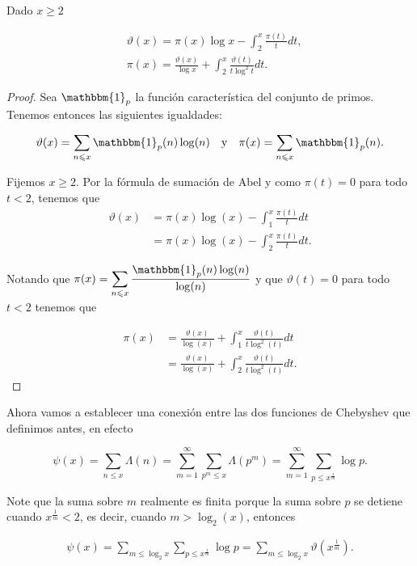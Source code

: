 \begin{theorem}Dado $x\geq 2$\label{rep integral de pi x}

    $$
    \begin{aligned}
    & \vartheta(x)=\pi(x) \log x-\int_2^x \frac{\pi(t)}{t} d t, \\
    & \pi(x)=\frac{\vartheta(x)}{\log x}+\int_2^x \frac{\vartheta(t)}{t \log ^2 t} d t .
    \end{aligned}
    $$
\end{theorem}

\begin{proof}
Sea  $\mathbbm{1}_{p}$ la función característica del conjunto de primos. Tenemos entonces las siguientes igualdades:

$$\vartheta(x)=\sum_{n \leqslant x} \mathbbm{1}_p(n) \log (n)\quad \text{y}\quad \pi(x)=\sum_{n \leqslant x} \mathbbm{1}_p(n).$$

Fijemos $x \geqslant 2$. Por la fórmula de sumación de Abel y como $\pi(t)=0$ para todo $t<2$, tenemos que
$$
\begin{aligned}
\vartheta(x) & =\pi(x) \log (x)-\int_1^x \frac{\pi(t)}{t} d t \\
& =\pi(x) \log (x)-\int_2^x \frac{\pi(t)}{t} d t.
\end{aligned}
$$

Notando que $\pi(x)=\displaystyle\sum_{n \leqslant x} \dfrac{\mathbbm{1}_p(n) \log (n)}{\log (n)}$ y que $\vartheta(t)=0$ para todo $t<2$ tenemos que

$$
\begin{aligned}
\pi(x) & =\frac{\vartheta(x)}{\log (x)}+\int_1^x \frac{\vartheta(t)}{t \log ^2(t)} d t \\
& =\frac{\vartheta(x)}{\log (x)}+\int_2^x \frac{\vartheta(t)}{t \log ^2(t)} d t.
\end{aligned}
$$
\end{proof}

Ahora vamos a establecer una conexión entre las dos funciones de Chebyshev que definimos antes, en efecto

$$
\psi(x)=\sum_{n \leq x} \Lambda(n)=\sum_{m=1}^{\infty} \sum_{p^m \leq x} \Lambda\left(p^m\right)=\sum_{m=1}^{\infty} \sum_{p \leq x^{\frac{1}{m}}} \log p .
$$

Note que la suma sobre $m$ realmente es finita porque la suma sobre $p$ se  detiene cuando $x^{\frac{1}{m}}<2$, es decir, cuando $m>\log_2(x)$, entonces

\begin{align}
    \psi(x)=\sum_{m \leq \log _2 x} \sum_{p \leq x^{\frac{1}{m}}} \log p=\sum_{m \leq \log _2 x} \vartheta\left(x^{\frac{1}{m}}\right).
\end{align}

